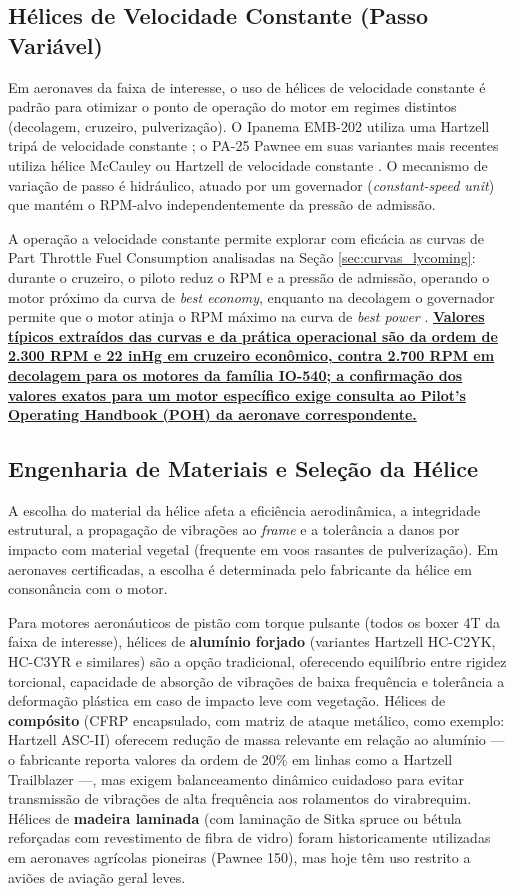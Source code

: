 \documentclass[a4paper,12pt]{article}
\newcommand{\autoeval}[1]{\textbf{\underline{#1}}}
\begin{document}
\subsection{Hélices de Velocidade Constante (Passo Variável)}
Em aeronaves da faixa de interesse, o uso de hélices de velocidade constante é padrão para otimizar o ponto de operação do motor em regimes distintos (decolagem, cruzeiro, pulverização). O Ipanema EMB-202 utiliza uma Hartzell tripá de velocidade constante \cite{embraer202, embraer202_wiki}; o PA-25 Pawnee em suas variantes mais recentes utiliza hélice McCauley ou Hartzell de velocidade constante \cite{piper_pa25}. O mecanismo de variação de passo é hidráulico, atuado por um governador (\textit{constant-speed unit}) que mantém o RPM-alvo independentemente da pressão de admissão.

A operação a velocidade constante permite explorar com eficácia as curvas de Part Throttle Fuel Consumption analisadas na Seção \ref{sec:curvas_lycoming}: durante o cruzeiro, o piloto reduz o RPM e a pressão de admissão, operando o motor próximo da curva de \textit{best economy}, enquanto na decolagem o governador permite que o motor atinja o RPM máximo na curva de \textit{best power} \cite{lycomingmanual, io360manual}. \autoeval{Valores típicos extraídos das curvas e da prática operacional são da ordem de 2.300 RPM e 22 inHg em cruzeiro econômico, contra 2.700 RPM em decolagem para os motores da família IO-540; a confirmação dos valores exatos para um motor específico exige consulta ao Pilot's Operating Handbook (POH) da aeronave correspondente.}

\subsection{Engenharia de Materiais e Seleção da Hélice}
A escolha do material da hélice afeta a eficiência aerodinâmica, a integridade estrutural, a propagação de vibrações ao \textit{frame} e a tolerância a danos por impacto com material vegetal (frequente em voos rasantes de pulverização). Em aeronaves certificadas, a escolha é determinada pelo fabricante da hélice em consonância com o motor.

Para motores aeronáuticos de pistão com torque pulsante (todos os boxer 4T da faixa de interesse), hélices de \textbf{alumínio forjado} (variantes Hartzell HC-C2YK, HC-C3YR e similares) são a opção tradicional, oferecendo equilíbrio entre rigidez torcional, capacidade de absorção de vibrações de baixa frequência e tolerância a deformação plástica em caso de impacto leve com vegetação. Hélices de \textbf{compósito} (CFRP encapsulado, com matriz de ataque metálico, como exemplo: Hartzell ASC-II) oferecem redução de massa relevante em relação ao alumínio --- o fabricante reporta valores da ordem de 20\% em linhas como a Hartzell Trailblazer \cite{hartzell_trailblazer, hartzell_composite_faq} ---, mas exigem balanceamento dinâmico cuidadoso para evitar transmissão de vibrações de alta frequência aos rolamentos do virabrequim. Hélices de \textbf{madeira laminada} (com laminação de Sitka spruce ou bétula reforçadas com revestimento de fibra de vidro) foram historicamente utilizadas em aeronaves agrícolas pioneiras (Pawnee 150), mas hoje têm uso restrito a aviões de aviação geral leves.
\end{document}
